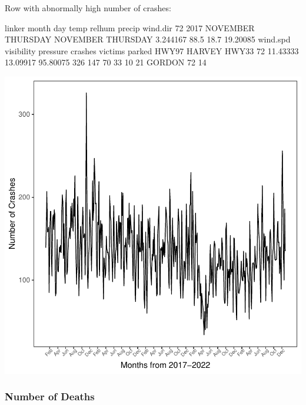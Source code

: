 \documentclass[11pt, a4paper]{article}
\begin{document}
\begin{Schunk}
\begin{Soutput}
Row with abnormally high number of crashes:
\end{Soutput}
\begin{Soutput}
                   linker    month      day     temp relhum precip wind.dir
72 2017 NOVEMBER THURSDAY NOVEMBER THURSDAY 3.244167   88.5   18.7 19.20085
   wind.spd visibility pressure crashes victims parked HWY97 HARVEY HWY33
72 11.43333   13.09917 95.80075     326     147     70    33     10    21
   GORDON
72     14
\end{Soutput}
\end{Schunk}
\includegraphics{variableinvestigation-042}


\pagebreak
\subsubsection{Number of Deaths}
\end{document}
